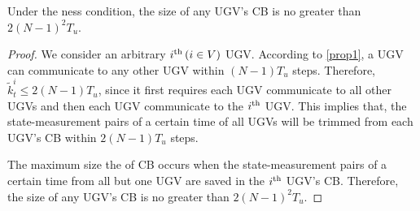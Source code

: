 	
	\begin{cor}\label{thm:max_CB_size}
		Under the \fc ness condition, the size of any UGV's CB is no greater than $2(N-1)^2T_u$.
	\end{cor}
	
	\begin{proof}
		We consider an arbitrary $i^\text{th}\,(i\in V)$ UGV.
		According to \cref{prop1}, a UGV can communicate to any other UGV within $(N-1)T_u$ steps.
		Therefore, $\tilde{k}^i_t\le 2(N-1)T_u$, since it first requires each UGV communicate to all other UGVs and then each UGV communicate to the $i^\text{th}$ UGV.
		This implies that, the state-measurement pairs of a certain time of all UGVs will be trimmed from each UGV's CB within $2(N-1)T_u$ steps.

		The maximum size the of CB occurs when the state-measurement pairs of a certain time from all but one UGV are saved in the $i^\text{th}$ UGV's CB.
		Therefore, the size of any UGV's CB is no greater than $2(N-1)^2T_u$.		
		
	\end{proof}
	
%		
	
